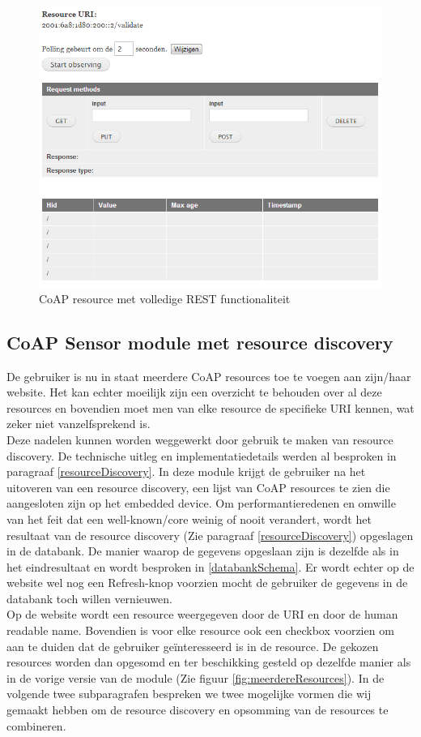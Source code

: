 \begin{figure}[h!]
\centering
\includegraphics[width=1\textwidth]{fig/rest}
\caption{CoAP resource met volledige REST functionaliteit}
\label{fig:rest}
\end{figure}

\subsection{CoAP Sensor module met resource discovery}
De gebruiker is nu in staat meerdere CoAP resources toe te voegen aan zijn/haar website. Het kan echter moeilijk zijn een overzicht te behouden over al deze resources en bovendien moet men van elke resource de specifieke URI kennen, wat zeker niet vanzelfsprekend is.\\

Deze nadelen kunnen worden weggewerkt door gebruik te maken van resource discovery. De technische uitleg en implementatiedetails werden al besproken in paragraaf \ref{resourceDiscovery}. In deze module krijgt de gebruiker na het uitoveren van een resource discovery, een lijst van CoAP resources te zien die aangesloten zijn op het embedded device. Om performantieredenen en omwille van het feit dat een well-known/core weinig of nooit verandert, wordt het resultaat van de resource discovery (Zie paragraaf \ref{resourceDiscovery}) opgeslagen in de databank. De manier waarop de gegevens opgeslaan zijn is dezelfde als in het eindresultaat en wordt besproken in \ref{databankSchema}. Er wordt echter op de website wel nog een Refresh-knop voorzien mocht de gebruiker de gegevens in de databank toch willen vernieuwen.\\
Op de website wordt een resource weergegeven door de URI en door de human readable name. Bovendien is voor elke resource ook een checkbox voorzien om aan te duiden dat de gebruiker ge\"{i}nteresseerd is in de resource. De gekozen resources worden dan opgesomd en ter beschikking gesteld op dezelfde manier als in de vorige versie van de module (Zie figuur \ref{fig:meerdereResources}). In de volgende twee subparagrafen bespreken we twee mogelijke vormen die wij gemaakt hebben om de resource discovery en opsomming van de resources te combineren.

